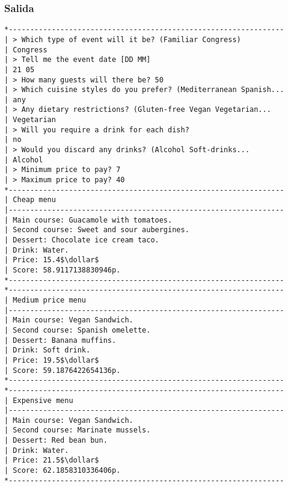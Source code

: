 \documentclass{article}
\newcommand{\dollar}{\mbox{\textdollar}}
\begin{document}
\subsubsection{Salida}
\begin{lstlisting}
*----------------------------------------------------------------
| > Which type of event will it be? (Familiar Congress)
| Congress
| > Tell me the event date [DD MM]
| 21 05
| > How many guests will there be? 50
| > Which cuisine styles do you prefer? (Mediterranean Spanish...
| any
| > Any dietary restrictions? (Gluten-free Vegan Vegetarian...
| Vegetarian
| > Will you require a drink for each dish?
| no
| > Would you discard any drinks? (Alcohol Soft-drinks...
| Alcohol
| > Minimum price to pay? 7
| > Maximum price to pay? 40
*----------------------------------------------------------------
| Cheap menu
|----------------------------------------------------------------
| Main course: Guacamole with tomatoes.
| Second course: Sweet and sour aubergines.
| Dessert: Chocolate ice cream taco.
| Drink: Water.
| Price: 15.4$\dollar$
| Score: 58.9117138830946p.
*----------------------------------------------------------------
*----------------------------------------------------------------
| Medium price menu
|----------------------------------------------------------------
| Main course: Vegan Sandwich.
| Second course: Spanish omelette.
| Dessert: Banana muffins.
| Drink: Soft drink.
| Price: 19.5$\dollar$
| Score: 59.1876422654136p.
*----------------------------------------------------------------
*----------------------------------------------------------------
| Expensive menu
|----------------------------------------------------------------
| Main course: Vegan Sandwich.
| Second course: Marinate mussels.
| Dessert: Red bean bun.
| Drink: Water.
| Price: 21.5$\dollar$
| Score: 62.1858310336406p.
*----------------------------------------------------------------
\end{lstlisting}
\end{document}
